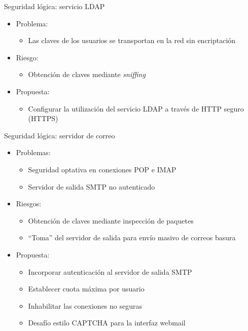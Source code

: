 \documentclass[spanish]{beamer}
\begin{document}
\begin{frame}{Seguridad lógica: servicio LDAP}
  \begin{itemize}
  \item Problema:
    \begin{itemize}
    \item Las claves de los usuarios se transportan en la red sin encriptación
    \end{itemize}
  \item Riesgo:
    \begin{itemize}
    \item Obtención de claves mediante \emph{sniffing}
    \end{itemize}
  \item Propuesta:
    \begin{itemize}
    \item Configurar la utilización del servicio LDAP a través de HTTP seguro (HTTPS)
    \end{itemize}
  \end{itemize}
\end{frame}


\begin{frame}{Seguridad lógica: servidor de correo}
  \begin{itemize}
  \item Problemas:
    \begin{itemize}
    \item Seguridad optativa en conexiones POP e IMAP
    \item Servidor de salida SMTP no autenticado
    \end{itemize}
  \item Riesgos:
    \begin{itemize}
    \item Obtención de claves mediante inspección de paquetes
    \item ``Toma'' del servidor de salida para envío masivo de correos basura
    \end{itemize}
  \item Propuesta:
    \begin{itemize}
    \item Incorporar autenticación al servidor de salida SMTP
    \item Establecer cuota máxima por usuario
    \item Inhabilitar las conexiones no seguras
    \item Desafío estilo CAPTCHA para la interfaz webmail
    \end{itemize}
  \end{itemize}
\end{frame}
\end{document}

